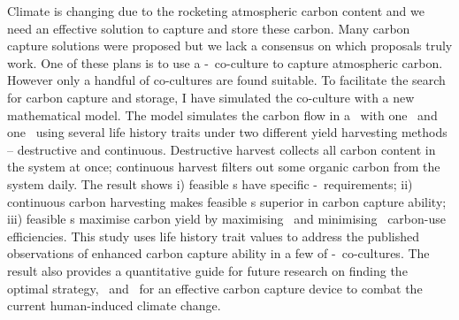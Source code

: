 \documentclass[../thesis.tex]{subfiles} %
\begin{document}
Climate is changing due to the rocketing atmospheric carbon content and we need an effective solution to capture and store these carbon.  Many carbon capture solutions were proposed but we lack a consensus on which proposals truly work.  One of these plans is to use a \phy-\bac\ co-culture to capture atmospheric carbon.  However only a handful of co-cultures are found suitable.  To facilitate the search for carbon capture and storage, I have simulated the co-culture with a new mathematical model.  The model simulates the carbon flow in a \pbs\ with one \phy\ and one \bacm\ using several life history traits under two different yield harvesting methods -- destructive and continuous.  Destructive harvest collects all carbon content in the system at once; continuous harvest filters out some organic carbon from the system daily.  The result shows \Rn{1}) feasible \pbs s have specific \phy-\bac\ requirements; \Rn{2}) continuous carbon harvesting makes feasible \pbs s superior in carbon capture ability; \Rn{3}) feasible \pbs s maximise carbon yield by maximising \phy\ and minimising \bac\ carbon-use efficiencies.  This study uses life history trait values to address the published observations of enhanced carbon capture ability in a few of \phy-\bac\ co-cultures.  The result also provides a quantitative guide for future research on finding the optimal strategy, \phy\ and \bac\ for an effective carbon capture device to combat the current human-induced climate change.
\end{document}
